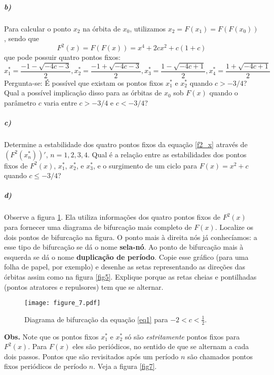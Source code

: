 \documentclass{article}
\begin{document}
\subparagraph{b)} Para calcular o ponto $x_2$ na órbita de $x_0$, utilizamos \mbox{$x_2 = F(x_1) = F(F(x_0))$}, sendo que \begin{equation}
F^2(x) = F(F(x)) = x^4 + 2cx^2 + c(1 + c)
\label{f2_x}
\end{equation}
que pode possuir quatro pontos fixos: \[
x^*_1 = \frac{-1 -\sqrt{-4c - 3}}{2}, x^*_2 = \frac{-1 + \sqrt{-4c - 3}}{2}, x^*_3 = \frac{1 -\sqrt{-4c + 1}}{2}, x^*_4 = \frac{1 +\sqrt{-4c + 1}}{2}
\]
Pergunta-se: É possível que existam os pontos fixos $x^*_1$ e $x^*_2$ quando $c > -3/4$? Qual a possível implicação disso para as órbitas de $x_0$ sob $F(x)$ quando o parâmetro $c$ varia entre $c > -3/4$ e $c < -3/4$?

\subparagraph{c)} Determine a estabilidade dos quatro pontos fixos da equação \ref{f2_x} através de $(F^2(x^*_n))'$, $n = 1,2,3,4$. Qual é a relação entre as estabilidades dos pontos fixos de $F^2(x)$, $x^*_1$, $x^*_2$, e $x^*_3$, e o surgimento de um ciclo para $F(x) = x^2 + c$ quando $c \leq -3/4$? 

\subparagraph{d)} Observe a figura \ref{fig6}. Ela utiliza informações dos quatro pontos fixos de $F^2(x)$ para fornecer uma diagrama de bifurcação mais completo de $F(x)$. Localize os dois pontos de bifurcação na figura. O ponto mais à direita nós já conhecíamos: a esse tipo de bifurcação se dá o nome \textbf{sela-nó}. Ao ponto de bifurcação mais à esquerda se dá o nome \textbf{duplicação de período}. Copie esse gráfico (para uma folha de papel, por exemplo) e desenhe as setas representando as direções das órbitas assim como na figura \ref{fig5}. Explique porque as retas cheias e pontilhadas (pontos atratores e repulsores) tem que se alternar.

\begin{figure}[hb]
\centering
\texttt{[image: figure\_7.pdf]}
\caption{Diagrama de bifurcação da equação \ref{eq1} para $-2 < c < \frac{1}{2}$.}
\label{fig6}
\end{figure}

\textbf{Obs.} Note que os pontos fixos $x^*_1$ e $x^*_2$ só são \emph{estritamente} pontos fixos para $F^2(x)$. Para $F(x)$ eles são periódicos, no sentido de que se alternam a cada dois passos. Pontos que são revisitados após um período $n$ são chamados pontos fixos periódicos de período $n$. Veja a figura \ref{fig7}.
\end{document}
